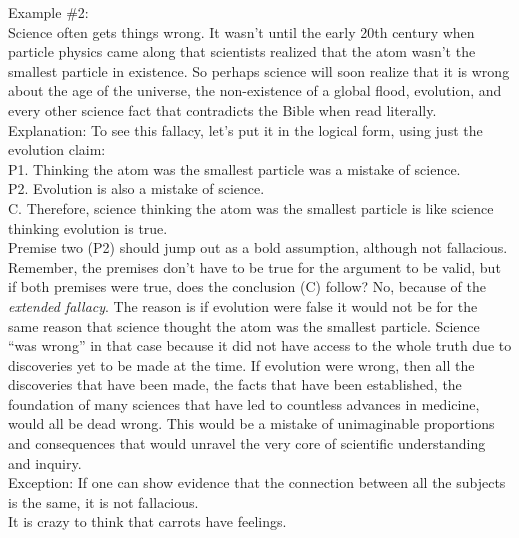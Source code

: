 \documentclass[a4paper,12pt,single,pdftex]{scrartcl}
\begin{document}
    
      Example \#2:
    \\

    
      Science often gets things wrong.  It wasn’t until the early 20th century when particle physics came along that scientists realized that the atom wasn’t the smallest particle in existence.  So perhaps science will soon realize that it is wrong about the age of the universe, the non-existence of a global flood, evolution, and every other science fact that contradicts the Bible when read literally.
    \\

    
      Explanation: To see this fallacy, let’s put it in the logical form, using just the evolution claim:
    \\

    
      P1. Thinking the atom was the smallest particle was a mistake of science.
    \\

    
      P2. Evolution is also a mistake of science.
    \\

    
      C. Therefore, science thinking the atom was the smallest particle is like science thinking evolution is true.
    \\

    
      Premise two (P2) should jump out as a bold assumption, although not fallacious.  Remember, the premises don’t have to be true for the argument to be valid, but if both premises were true, does the conclusion (C) follow?  No, because of the {\it extended fallacy}.  The reason is if evolution were false it would not be for the same reason that science thought the atom was the smallest particle.  Science “was wrong” in that case because it did not have access to the whole truth due to discoveries yet to be made at the time.  If evolution were wrong, then all the discoveries that have been made, the facts that have been established, the foundation of many sciences that have led to countless advances in medicine, would all be dead wrong.  This would be a mistake of unimaginable proportions and consequences that would unravel the very core of scientific understanding and inquiry.
    \\

    
      Exception: If one can show evidence that the connection between all the subjects is the same, it is not fallacious.
    \\

    
      It is crazy to think that carrots have feelings.
    \\
\end{document}
